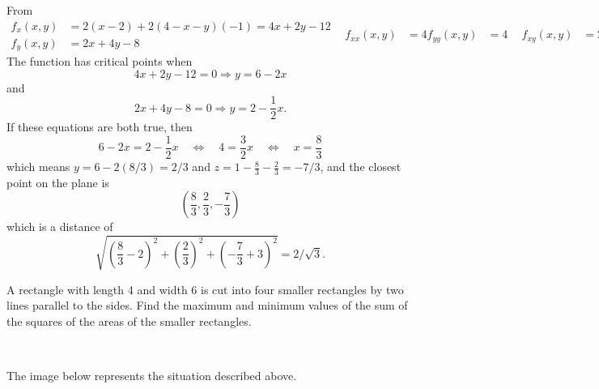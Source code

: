 \documentclass[12pt]{exam}
\newcommand{\bif}{\quad\iff\quad}
\begin{document}
\begin{questions}
\begin{solution}
            From 
            \begin{equation*}
                \begin{aligned}
                    f_x(x,y)&=2(x-2)+2(4-x-y)(-1)=4x+2y-12\\
                    f_y(x,y)&=2x+4y-8
                \end{aligned}~~
                \begin{aligned}
                    f_{xx}(x,y)&=4
                    f_{yy}(x,y)&=4
                \end{aligned}~~
                \begin{aligned}
                    f_{xy}(x,y)&=2
                        &
                \end{aligned}~~
            \end{equation*}
            The function has critical points when 
            \[
                4x+2y-12=0\Rightarrow y=6-2x
            \]
            and
            \[
                2x+4y-8=0\Rightarrow y=2-\frac{1}{2}x.
            \]
            If these equations are both true, then 
            \[
                6-2x=2-\frac{1}{2}x \bif 4=\frac{3}{2}x \bif x=\frac{8}{3}
            \]
            which means \(y=6-2(8/3)=2/3\) and \(z=1-\frac{8}{3}-\frac{2}{3}=-7/3\),
            and the closest point on the plane is 
            \[
                \left(\frac{8}{3},\frac{2}{3},-\frac{7}{3}\right) 
            \]
            which is a distance of
            \[
                \sqrt{
                    \left(\frac{8}{3}-2 \right)^2
                    +\left(\frac{2}{3}\right)^2+\left(-\frac{7}{3}+3\right)^2
                }=2/\sqrt{3}.
            \]

        \end{solution}
    \else
        \vfill
    \fi

\question A rectangle with length 4 and width 6 is cut into four smaller rectangles by two lines parallel to the sides. Find the maximum and minimum values of the sum of the squares of the areas of the smaller rectangles.
    \ifprintanswers
        \begin{solution}~

            The image below represents the situation described above. 
            \begin{center}
\end{center}
\end{solution}
\end{questions}
\end{document}
